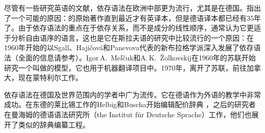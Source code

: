 尽管有一些研究英语的文献\citep{Anderson71a-u,Hudson84a-u}，依存语法在欧洲中部更为流行，尤其是在德国\citep[--57]{Engel96a}。\citet[]{AF2010a}指出了一个可能的原因：\tes 的原始著作直到最近才有英译本\citep{Tesniere2015a-not-crossreferenced}，但是德语译本都已经有35年了\citep{Tesniere80a-u}。由于依存语法的重点在于依存关系，而不是成分的线性顺序，通常认为它更适于分析自由语序的语言，这也是它在斯拉夫语的研究中比较流行的一个原因：在1960年开始的以Sgall、Hajičová和Panevova代表的新布拉格学派深入发展了依存语法（全面的信息请参考\citealp{HS2003a-u}）。Igor\,A.\ Meľčuk和A.\,K.\ Žolkovskij在1960年的苏联开始研究一个叫做\mttc 的模型，它也用于机器翻译项目中\citep{Melcuk64a-u,Melcuk81a,Melcuk88a-u,Kahane2003a-u}。1970年，\mel 离开了苏联，前往加拿大，现在蒙特利尔工作。

依存语法在德国及世界范围内的学者中广为流传。它在德语作为外语的教学中非常成功\citep{HB69a-u,HB98a}。在东德的莱比锡工作的Helbig和Buscha开始编辑配价辞典\citep{HS69a-u} ，之后的研究者在曼海姆的德语语法研究所（the Institut für Deutsche Sprache）工作，他们也展开了类似的辞典编纂工程\citep{SKSR2004a-u}。


